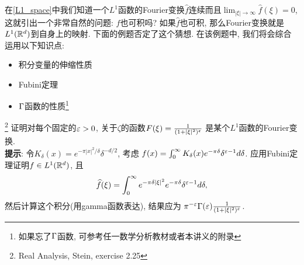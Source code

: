 在\ref{L1_space}中我们知道一个$L^1$函数的Fourier变换$\hat{f}$连续而且$\lim_{|\xi|\to \infty}\hat{f}(\xi) = 0$, 这就引出一个非常自然的问题: $\hat{f}$也可积吗? 如果$\hat{f}$也可积, 那么Fourier变换就是$L^1(\mathbb{R}^d)$到自身上的映射. 下面的例题否定了这个猜想. 在该例题中, 我们将会综合运用以下知识点:
\begin{itemize}
    \item 积分变量的伸缩性质
    \item Fubini定理
    \item $\Gamma$函数的性质\footnote{如果忘了$\Gamma$函数, 可参考任一数学分析教材或者本讲义的附录}
    
\end{itemize}
\begin{example}\footnote{Real Analysis, Stein, exercise 2.25}
    {\everymath{\displaystyle}
    证明对每个固定的$\varepsilon > 0$, 关于$\zeta$的函数$F(\xi)=\frac{1}{(1+|\xi|^2)^\varepsilon}$
    是某个$L^1$函数的Fourier变换. \\
    \textbf{提示}: 令$K_\delta(x)=e^{-\pi|x|^2/\delta} \delta^{-d/2}$, 考虑
    $f(x)=\int_0^\infty K_\delta(x)e^{-\pi \delta}\delta^{\varepsilon-1} d\delta$. 
    应用Fubini定理证明$f \in L^1(\mathbb{R}^d)$, 且$$\widehat{f}(\xi) = \int_0^\infty e^{-\pi \delta |\xi|^2} e^{-\pi \delta} \delta^{\varepsilon-1} d\delta, $$
    然后计算这个积分(用gamma函数表达), 结果应为
    $\pi^{-\varepsilon}\Gamma(\varepsilon)\frac{1}{(1+|\xi|^2)^\varepsilon}$.
    }
\end{example}

